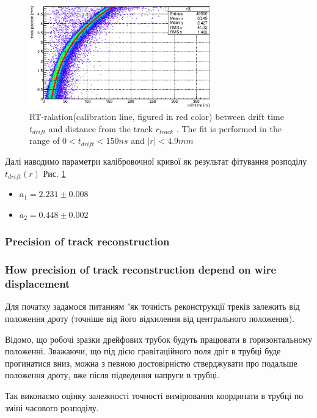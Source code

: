 \documentclass[]{article}
\begin{document}
	\begin{figure}[h]
	\includegraphics[width=0.7\textwidth]{rt_calibration.eps}
	\centering
	\caption{ RT-ralation(calibration line, figured in red color) between drift time $t_{drift}$ and distance from the  track $r_{track}$ .  The fit is performed in the range of
$0 < t_{drift} < 150 ns$ and $|r| < 4.9mm$ }
	\label{fig:calibration_00}
	\end{figure}
	
	Далі наводимо параметри калібровочної кривої як результат фітування розподілу $t_{drift}(r)$ Рис. \ref{fig:calibration_00} 
	
	\begin{itemize}
		\item $a_1 = 2.231 \pm 0.008$
		\item $a_2 = 0.448 \pm 0.002$
	\end{itemize}
	
	\subsubsection{Precision of track reconstruction}	

	\subsubsection{ How precision of track reconstruction depend on wire displacement }
	Для початку задамося питанням "як точність реконструкції треків залежить 	від положення дроту (точніше від його відхилення від центрального положення).
	
	Відомо, що робочі зразки дрейфових трубок будуть працювати в горизонтальному положенні. Зважаючи, що під дією гравітаційного поля дріт в трубці буде прогинатися вниз, можна з певною достовірністю стверджувати про подальше положення дроту, вже після підведення напруги в трубці.
	
	Так виконаємо оцінку залежності точності вимірювання координати в трубці  по зміні часового розподілу.
	
\end{document}
